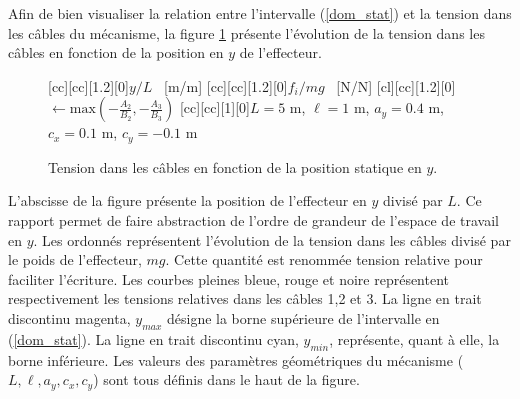 Afin de bien visualiser la relation entre l'intervalle (\ref{dom_stat}) et la tension dans les câbles du mécanisme, la figure \ref{chap1:fig:ten_stat} présente l'évolution de la tension dans les câbles en fonction de la position en $y$ de l'effecteur.
\begin{figure}[h!]
\centering
{}[cc][cc][1.2][0]{$y/L$ \ [m/m]}
[cc][cc][1.2][0]{$f_i/mg$ \ [N/N]}
[cl][cc][1.2][0]{$\leftarrow\text{max}\left(-\frac{A_2}{B_2},-\frac{A_3}{B_3}\right)$}
[cc][cc][1][0]{$L=5$ m, $\ell = 1$ m, $a_y =0.4$ m, $c_x = 0.1$ m, $c_y =-0.1$ m }
\caption{\label{chap1:fig:ten_stat} Tension dans les câbles en fonction de la position statique en $y$.}
\end{figure}
L'abscisse de la figure présente la position de l'effecteur en $y$ divisé par $L$. Ce rapport permet de faire abstraction de l'ordre de grandeur de l'espace de travail en $y$. Les ordonnés représentent l'évolution de la tension dans les câbles divisé par le poids de l'effecteur, $mg$. Cette quantité est renommée tension relative pour faciliter l'écriture. Les courbes pleines bleue, rouge et noire représentent respectivement les tensions relatives dans les câbles 1,2 et 3. La ligne en trait discontinu magenta, $y_{max}$ désigne la borne supérieure de l'intervalle en (\ref{dom_stat}). La ligne en trait discontinu cyan, $y_{min}$, représente, quant à elle, la borne inférieure. Les valeurs des paramètres géométriques du mécanisme ($L,\ell,a_y,c_x,c_y$) sont tous définis dans le haut de la figure. \par
